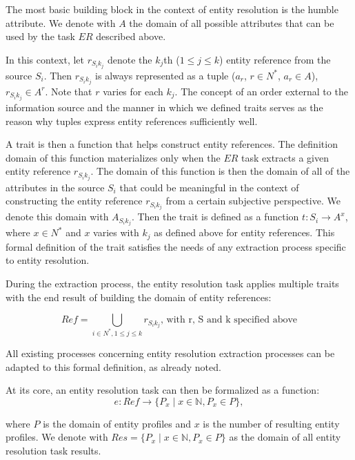 \documentclass[11pt]{article}
\begin{document}
    The most basic building block in the context of entity resolution is the
    humble attribute.
    We denote with $A$ the domain of all possible attributes that can be used by
    the task $ER$ described above.

    In this context, let $r_{{S_i}{k_j}}$ denote the $k_j$th ($1 \leq j \leq k$)
    entity reference from the source $S_i$.
    Then $r_{{S_i}{k_j}}$ is always represented as a tuple
    ($a_r$, $r \in N^*$, $a_r \in A$), $r_{{S_i}{k_j}} \in A^r$.
    Note that $r$ varies for each $k_j$.
    The concept of an order external to the information source and the manner in
    which we defined traits serves as the reason why tuples express entity
    references sufficiently well.

    A trait is then a function that helps construct entity references.
    The definition domain of this function materializes only when the $ER$ task
    extracts a given entity reference $r_{{S_i}{k_j}}$.
    The domain of this function is then the domain of all of the attributes in
    the source $S_i$ that could be meaningful in the context of constructing the
    entity reference $r_{{S_i}{k_j}}$ from a certain subjective perspective.
    We denote this domain with $A_{{S_i}{k_j}}$.
    Then the trait is defined as a function $t: S_i \rightarrow A^x$, where
    $x \in N^*$ and $x$ varies with $k_j$ as defined above for entity
    references.
    This formal definition of the trait satisfies the needs of any extraction
    process specific to entity resolution.

    During the extraction process, the entity resolution task applies multiple
    traits with the end result of building the domain of entity references:

    \[
        Ref = \bigcup_{i \in N^*,1 \leq j \leq k} r_{{S_i}{k_j}}
        \textrm{, with r, S and k specified above}
    \]

    All existing processes concerning entity resolution extraction processes can
    be adapted to this formal definition, as already noted\cite{Pap19}.
    
    At its core, an entity resolution task can then be formalized as a function:
    \[
        e : Ref \rightarrow \{P_x \mid x \in \mathbb{N}, P_x \in P \},
    \]
    
    where $P$ is the domain of entity profiles and $x$ is the number of
    resulting entity profiles.
    We denote with $Res=\{P_x \mid x \in \mathbb{N}, P_x \in P\}$ as the domain
    of all entity resolution task results.
\end{document}
